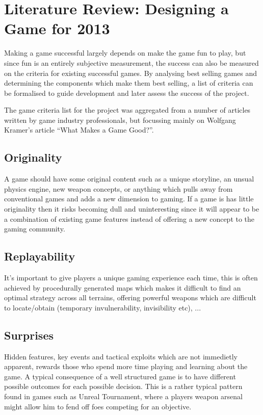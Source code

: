 
\section{Literature Review: Designing a Game for 2013}

Making a game successful largely depends on make the game fun to play, but since fun is an entirely subjective measurement, the success can also be measured on the criteria for existing successful games. By analysing best selling games and determining the components which make them best selling, a list of criteria can be formalised to guide development and later assess the success of the project.

The game criteria list for the project was aggregated from a number of articles written by game industry professionals, but focussing mainly on Wolfgang Kramer's article ``What Makes a Game Good?''.


\subsection*{Originality} A game should have some original content such as a unique storyline, an unsual physics engine, new weapon concepts, or anything which pulls away from conventional games and adds a new dimension to gaming. If a game is has little originality then it risks becoming dull and uninteresting since it will appear to be a combination of existing game features instead of offering a new concept to the gaming community.

\subsection*{Replayability} It's important to give players a unique gaming experience each time, this is often achieved by procedurally generated maps which makes it difficult to find an optimal strategy across all terrains, offering powerful weapons which are difficult to locate/obtain (temporary invulnerability, invisibility etc), 
...
\subsection*{Surprises} Hidden features, key events and tactical exploits which are not immedietly apparent, rewards those who spend more time playing and learning about the game. A typical consequence of a well structured game is to have different possible outcomes for each possible decision. This is a rather typical pattern found in games such as Unreal Tournament, where a players weapon arsenal might allow him to fend off foes competing for an objective.

